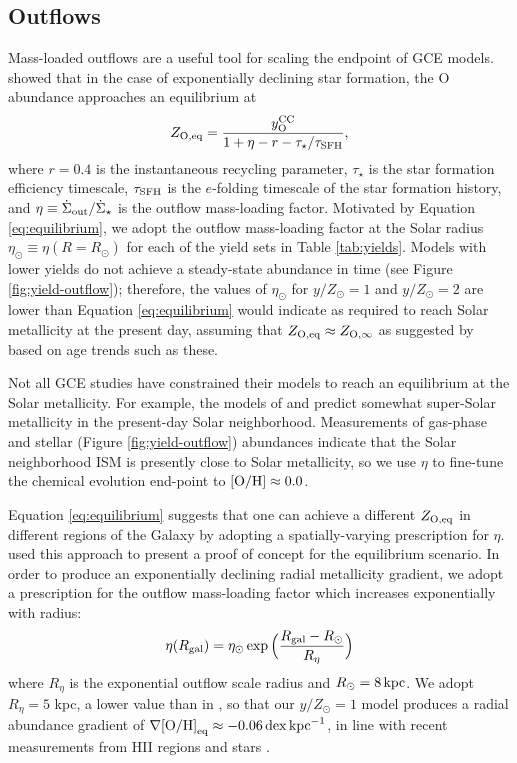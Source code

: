 \documentclass[twocolumn,twocolappendix,linenumbers]{aastex631}
\newcommand{\mathOH}{{\rm [O/H]}}
\newcommand{\yZ}[1]{$y/Z_\odot=#1$}
\newcommand{\kpc}{\,{\rm kpc}}
\begin{document}
\subsection{Outflows}
\label{sec:outflows}

Mass-loaded outflows are a useful tool for scaling the endpoint of GCE models. \citet{weinberg_equilibrium_2017} showed that in the case of exponentially declining star formation, the O abundance approaches an equilibrium at
\begin{equation}
    \label{eq:equilibrium}
    Z_{\rm O,eq} = \frac{y_{\rm O}^{\rm CC}}{1 + \eta - r - \tau_\star/\tau_{\rm SFH}},
\end{equation}
where $r=0.4$ is the instantaneous recycling parameter, $\tau_\star$ is the star formation efficiency timescale, $\tau_{\rm SFH}$ is the $e$-folding timescale of the star formation history, and $\eta\equiv \dot\Sigma_{\rm out}/\dot\Sigma_\star$ is the outflow mass-loading factor. Motivated by Equation \ref{eq:equilibrium}, we adopt the outflow mass-loading factor at the Solar radius $\eta_\odot\equiv\eta(R=R_\odot)$ for each of the yield sets in Table \ref{tab:yields}. Models with lower yields do not achieve a steady-state abundance in time (see Figure \ref{fig:yield-outflow}); therefore, the values of $\eta_\odot$ for \yZ{1} and \yZ{2} are lower than Equation \ref{eq:equilibrium} would indicate as required to reach Solar metallicity at the present day, assuming that $Z_{\rm O,eq}\approx Z_{\rm O,\infty}$ as suggested by \citet{johnson_milky_2024} based on age trends such as these.

Not all GCE studies have constrained their models to reach an equilibrium at the Solar metallicity. For example, the models of \citet{palla_chemical_2020} and \citet{spitoni_remind_2024} predict somewhat super-Solar metallicity in the present-day Solar neighborhood. Measurements of gas-phase \citep[e.g.,][]{mendez-delgado_gradients_2022} and stellar (Figure \ref{fig:yield-outflow}) abundances  indicate that the Solar neighborhood ISM is presently close to Solar metallicity, so we use $\eta$ to fine-tune the chemical evolution end-point to $\mathOH\approx0.0$.

Equation \ref{eq:equilibrium} suggests that one can achieve a different $Z_{\rm O,eq}$ in different regions of the Galaxy by adopting a spatially-varying prescription for $\eta$. \citet{johnson_milky_2024} used this approach to present a proof of concept for the equilibrium scenario. In order to produce an exponentially declining radial metallicity gradient, we adopt a prescription for the outflow mass-loading factor which increases exponentially with radius:
\begin{equation}
    \eta(R_{\rm gal}) = \eta_\odot \exp\Big(\frac{R_{\rm gal}-R_\odot}{R_\eta}\Big)
\end{equation}
where $R_\eta$ is the exponential outflow scale radius and $R_\odot=8\kpc$. We adopt $R_\eta=5$ kpc, a lower value than in \citet{johnson_milky_2024}, so that our $y/Z_\odot=1$ model produces a radial abundance gradient of $\nabla\mathOH_{\rm eq}\approx-0.06\,{\rm dex}\kpc^{-1}$, in line with recent measurements from HII regions \citep{mendez-delgado_gradients_2022} and stars \citep{myers_open_2022,johnson_milky_2024}.
\end{document}
